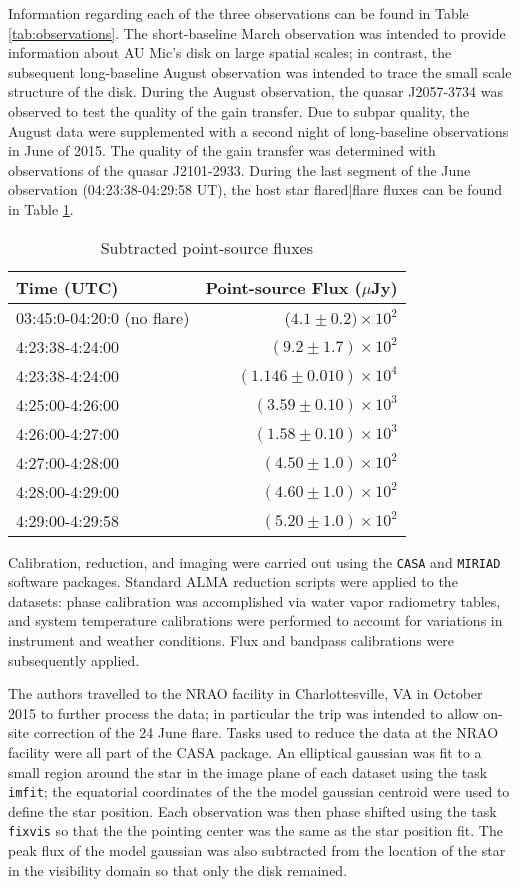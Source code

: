 \documentclass[12pt,oneside]{book}
\begin{document}
Information regarding each of the three observations can be found in Table \ref{tab:observations}. 
The short-baseline March observation was intended to provide information about AU Mic's disk on large spatial scales; in contrast, the subsequent long-baseline August observation was intended to trace the small scale structure of the disk. 
During the August observation, the quasar J2057-3734 was observed to test the quality of the gain transfer.
Due to subpar quality, the August data were supplemented with a second night of long-baseline observations in June of 2015. 
The quality of the gain transfer was determined with observations of the quasar J2101-2933.
During the last segment of the June observation (04:23:38-04:29:58 UT), the host star flared|flare fluxes can be found in Table \ref{tab:flare fluxes}.

\begin{table}	
  \centering
	\caption{Subtracted point-source fluxes}
  \label{tab:flare fluxes}
  \begin{tabular}{lr}
    \toprule
    Time (UTC) & Point-source Flux ($\mu$Jy) \\
    \midrule
    03:45:0-04:20:0 (no flare) & ($4.1 \pm 0.2)  \times 10^2$\\
  	4:23:38-4:24:00 & $(9.2 \pm 1.7) \times 10^2$ \\
  	4:23:38-4:24:00 & $(1.146 \pm 0.010) \times 10^4$ \\
  	4:25:00-4:26:00 & $(3.59 \pm 0.10) \times 10^3$ \\
  	4:26:00-4:27:00 & $(1.58 \pm 0.10) \times 10^3$ \\
  	4:27:00-4:28:00 & $(4.50 \pm 1.0) \times 10^2$ \\
  	4:28:00-4:29:00 & $(4.60 \pm 1.0) \times 10^2$ \\
  	4:29:00-4:29:58 & $(5.20 \pm 1.0) \times 10^2$\\
    \bottomrule
  \end{tabular}
\end{table}

Calibration, reduction, and imaging were carried out using the \texttt{CASA} and
\texttt{MIRIAD} software packages. Standard ALMA reduction scripts were applied
to the datasets: phase calibration was accomplished via water vapor radiometry
tables, and system temperature calibrations were performed to account for
variations in instrument and weather conditions. Flux and bandpass calibrations
were subsequently applied.

The authors travelled to the NRAO facility in Charlottesville, VA in October
2015 to further process the data; in particular the trip was intended to allow
on-site correction of the 24 June flare. Tasks used to reduce the data at the
NRAO facility were all part of the CASA package. An elliptical gaussian was fit
to a small region around the star in the image plane of each dataset using the
task \texttt{imfit}; the equatorial coordinates of the the model gaussian
centroid were used to define the star position. Each observation was then phase
shifted using the task \texttt{fixvis} so that the the pointing center was the
same as the star position fit. The peak flux of the model gaussian
was also subtracted from the location of the star in the visibility domain so
that only the disk remained.
\end{document}
